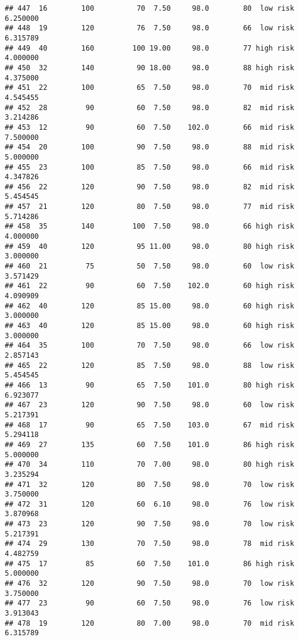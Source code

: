 \documentclass[
  ignorenonframetext,
]{beamer}
\begin{document}
\begin{frame}[fragile]
\begin{verbatim}
## 447  16        100          70  7.50     98.0        80  low risk      6.250000
## 448  19        120          76  7.50     98.0        66  low risk      6.315789
## 449  40        160         100 19.00     98.0        77 high risk      4.000000
## 450  32        140          90 18.00     98.0        88 high risk      4.375000
## 451  22        100          65  7.50     98.0        70  mid risk      4.545455
## 452  28         90          60  7.50     98.0        82  mid risk      3.214286
## 453  12         90          60  7.50    102.0        66  mid risk      7.500000
## 454  20        100          90  7.50     98.0        88  mid risk      5.000000
## 455  23        100          85  7.50     98.0        66  mid risk      4.347826
## 456  22        120          90  7.50     98.0        82  mid risk      5.454545
## 457  21        120          80  7.50     98.0        77  mid risk      5.714286
## 458  35        140         100  7.50     98.0        66 high risk      4.000000
## 459  40        120          95 11.00     98.0        80 high risk      3.000000
## 460  21         75          50  7.50     98.0        60  low risk      3.571429
## 461  22         90          60  7.50    102.0        60 high risk      4.090909
## 462  40        120          85 15.00     98.0        60 high risk      3.000000
## 463  40        120          85 15.00     98.0        60 high risk      3.000000
## 464  35        100          70  7.50     98.0        66  low risk      2.857143
## 465  22        120          85  7.50     98.0        88  low risk      5.454545
## 466  13         90          65  7.50    101.0        80 high risk      6.923077
## 467  23        120          90  7.50     98.0        60  low risk      5.217391
## 468  17         90          65  7.50    103.0        67  mid risk      5.294118
## 469  27        135          60  7.50    101.0        86 high risk      5.000000
## 470  34        110          70  7.00     98.0        80 high risk      3.235294
## 471  32        120          80  7.50     98.0        70  low risk      3.750000
## 472  31        120          60  6.10     98.0        76  low risk      3.870968
## 473  23        120          90  7.50     98.0        70  low risk      5.217391
## 474  29        130          70  7.50     98.0        78  mid risk      4.482759
## 475  17         85          60  7.50    101.0        86 high risk      5.000000
## 476  32        120          90  7.50     98.0        70  low risk      3.750000
## 477  23         90          60  7.50     98.0        76  low risk      3.913043
## 478  19        120          80  7.00     98.0        70  mid risk      6.315789

\end{verbatim}
\end{frame}
\end{document}
